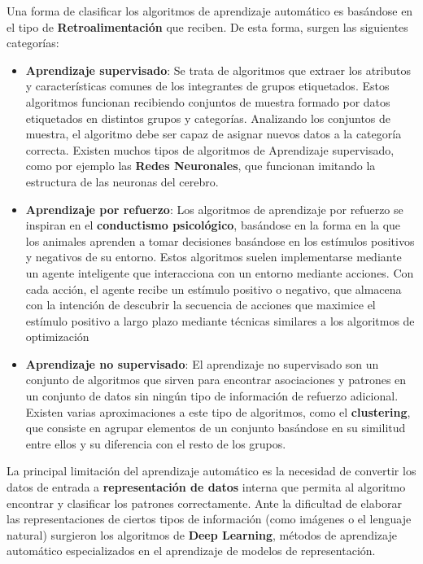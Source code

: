 Una forma de clasificar los algoritmos de aprendizaje automático es basándose en el tipo de \textbf{Retroalimentación} que reciben. De esta forma, surgen las siguientes categorías:
\begin{itemize}
\item \textbf{Aprendizaje supervisado}: Se trata de algoritmos que extraer los atributos y características comunes de los integrantes de grupos etiquetados. Estos algoritmos funcionan recibiendo conjuntos de muestra formado por datos etiquetados en distintos grupos y categorías. Analizando los conjuntos de muestra, el algoritmo debe ser capaz de asignar nuevos datos a la categoría correcta. Existen muchos tipos de algoritmos de Aprendizaje supervisado, como por ejemplo las \textbf{Redes Neuronales}, que funcionan imitando la estructura de las neuronas del cerebro.
\item \textbf{Aprendizaje por refuerzo}: Los algoritmos de aprendizaje por refuerzo se inspiran en el \textbf{conductismo psicológico}, basándose en la forma en la que los animales aprenden a tomar decisiones basándose en los estímulos positivos y negativos de su entorno. Estos algoritmos suelen implementarse mediante un agente inteligente que interacciona con un entorno mediante acciones. Con cada acción, el agente recibe un estímulo positivo o negativo, que almacena con la intención de descubrir la secuencia de acciones que maximice el estímulo positivo a largo plazo mediante técnicas similares a los algoritmos de optimización
\item \textbf{Aprendizaje no supervisado}: El aprendizaje no supervisado son un conjunto de algoritmos que sirven para encontrar asociaciones y patrones en un conjunto de datos sin ningún tipo de información de refuerzo adicional. Existen varias aproximaciones a este tipo de algoritmos, como el \textbf{clustering}, que consiste en agrupar elementos de un conjunto basándose en su similitud entre ellos y su diferencia con el resto de los grupos.
\end{itemize} 

La principal limitación del aprendizaje automático es la necesidad de convertir los datos de entrada a \textbf{representación de datos} interna que permita al algoritmo encontrar y clasificar los patrones correctamente. Ante la dificultad de elaborar las representaciones de ciertos tipos de información (como imágenes o el lenguaje natural) surgieron los algoritmos de \textbf{Deep Learning}, métodos de aprendizaje automático especializados en el aprendizaje de modelos de representación.

